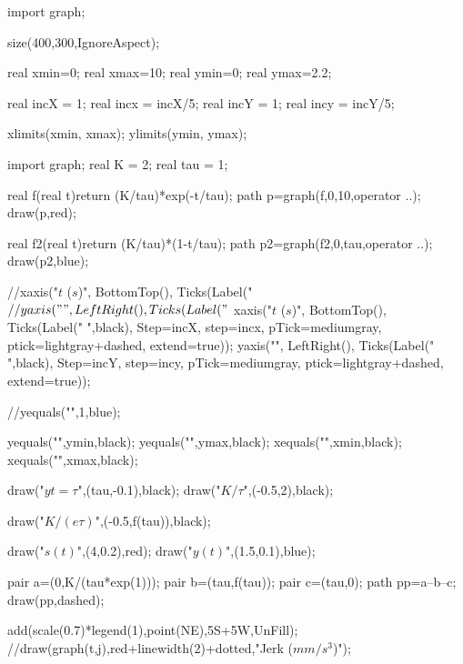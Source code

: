 import graph;

size(400,300,IgnoreAspect);

real xmin=0;
real xmax=10;
real ymin=0;
real ymax=2.2;

real incX = 1;
real incx = incX/5;
real incY = 1;
real incy = incY/5;


xlimits(xmin, xmax);
ylimits(ymin, ymax);

import graph;
real K = 2;
real tau = 1;

real f(real t){return (K/tau)*exp(-t/tau);}
path p=graph(f,0,10,operator ..);
draw(p,red);

real f2(real t){return (K/tau)*(1-t/tau);}
path p2=graph(f2,0,tau,operator ..);
draw(p2,blue);

//xaxis("$t$ ($s$)", BottomTop(), Ticks(Label("$%
//yaxis("", LeftRight(), Ticks(Label("$%
xaxis("$t$ ($s$)", BottomTop(), Ticks(Label(" ",black), Step=incX, step=incx, pTick=mediumgray, ptick=lightgray+dashed, extend=true));
yaxis("", LeftRight(), Ticks(Label(" ",black), Step=incY, step=incy, pTick=mediumgray, ptick=lightgray+dashed, extend=true));


//yequals("",1,blue);

yequals("",ymin,black);
yequals("",ymax,black);
xequals("",xmin,black);
xequals("",xmax,black);

draw("$yt=\tau$",(tau,-0.1),black);
draw("$K/\tau$",(-0.5,2),black);

draw("$K/(e\tau)$",(-0.5,f(tau)),black);

draw("$s(t)$",(4,0.2),red);
draw("$y(t)$",(1.5,0.1),blue);


pair a=(0,K/(tau*exp(1)));
pair b=(tau,f(tau));
pair c=(tau,0);
path pp=a--b--c;
draw(pp,dashed);


add(scale(0.7)*legend(1),point(NE),5S+5W,UnFill);
//draw(graph(t,j),red+linewidth(2)+dotted,"Jerk ($mm/s^3$)");

